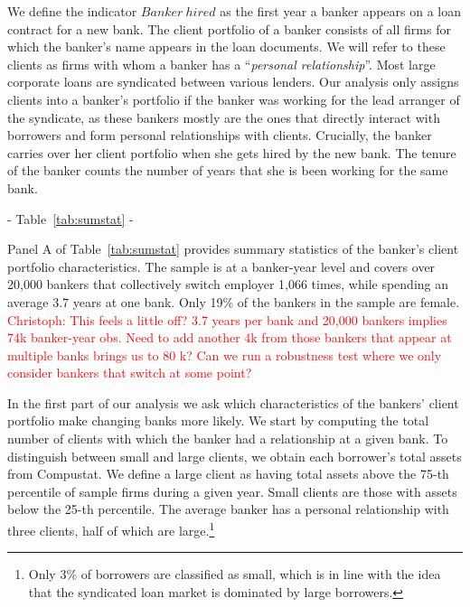 We define the indicator $Banker~hired$ as the first year a banker appears on a loan contract for a new bank. The client portfolio of a banker consists of all firms for which the banker's name appears in the loan documents. We will refer to these clients as firms with whom a banker has a ``\emph{personal relationship}''.  Most large corporate loans are syndicated between various lenders. Our analysis only assigns clients into a banker's portfolio if the banker was working for the lead arranger of the syndicate, as these bankers mostly are the ones that directly interact with borrowers and form personal relationships with clients. Crucially, the banker carries over her client portfolio when she gets hired by the new bank. The tenure of the banker counts the number of years that she is been working for the same bank. %

\begin{center} - Table~\ref{tab:sumstat} - \end{center}

Panel A of Table~\ref{tab:sumstat} provides summary statistics of the banker's client portfolio characteristics. The sample is at a banker-year level and covers over 20,000 bankers that collectively switch employer 1,066 times, while spending an average 3.7 years at one bank. Only 19\% of the bankers in the sample are female.  \textcolor{red}{Christoph: This feels a little off? 3.7 years per bank and 20,000 bankers implies 74k banker-year obs. Need to add another 4k from those bankers that appear at multiple banks brings us to 80 k? Can we run a robustness test where we only consider bankers that switch at some point? }

In the first part of our analysis we ask which characteristics of the bankers' client portfolio make changing banks more likely. We start by computing the total number of clients with which the banker had a relationship at a given bank. To distinguish between small and large clients, we obtain each borrower's total assets from Compustat. We define a large client as having total assets above the 75-th percentile of sample firms during a given year. Small clients are those with assets below the 25-th percentile. The average banker has a personal relationship with three clients, half of which are large.\footnote{Only 3\% of borrowers are classified as small, which is in line with the idea that the syndicated loan market is dominated by large borrowers.}

